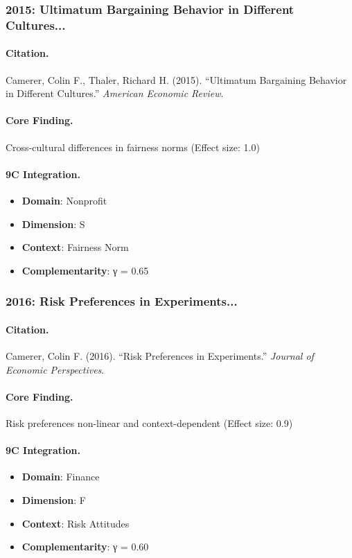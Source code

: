 \subsubsection{2015: Ultimatum Bargaining Behavior in Different Cultures...}

\paragraph{Citation.}
Camerer, Colin F., Thaler, Richard H. (2015). ``Ultimatum Bargaining Behavior in Different Cultures.''
\textit{American Economic Review}.

\paragraph{Core Finding.}
Cross-cultural differences in fairness norms (Effect size: 1.0)

\paragraph{9C Integration.}
\begin{itemize}[nosep]
  \item \textbf{Domain}: Nonprofit
  \item \textbf{Dimension}: S
  \item \textbf{Context}: Fairness Norm
  \item \textbf{Complementarity}: γ = 0.65
\end{itemize}

\subsubsection{2016: Risk Preferences in Experiments...}

\paragraph{Citation.}
Camerer, Colin F. (2016). ``Risk Preferences in Experiments.''
\textit{Journal of Economic Perspectives}.

\paragraph{Core Finding.}
Risk preferences non-linear and context-dependent (Effect size: 0.9)

\paragraph{9C Integration.}
\begin{itemize}[nosep]
  \item \textbf{Domain}: Finance
  \item \textbf{Dimension}: F
  \item \textbf{Context}: Risk Attitudes
  \item \textbf{Complementarity}: γ = 0.60
\end{itemize}

